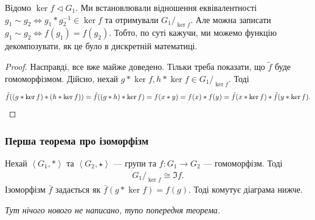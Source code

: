 \documentclass{math_library}
\begin{document}
\begin{remark}
Відомо $\ker f \triangleleft G_1$. Ми встановлювали відношення еквівалентності $g_1 \sim g_2 \iff g_1*g_2^{-1} \in \ker f$ та отримували $G_1/_{\ker f}$. Але можна записати $g_1 \sim g_2 \iff f(g_1) = f(g_2)$. Тобто, по суті кажучи, ми можемо функцію декомпозувати, як це було в дискретній математиці.
\end{remark}

\begin{proof}
Насправді, все вже майже доведено. Тільки треба показати, що $\tilde{f}$ буде гомоморфізмом. Дійсно, нехай $g*\ker f, h*\ker f \in G_1/_{\ker f}$. Тоді
\begin{gather*}
\tilde{f}((g*\ker f)*(h*\ker f)) = \tilde{f}((g*h)*\ker f) = f(x*y) = f(x)*f(y) = \tilde{f}(x*\ker f)* \tilde{f}(y*\ker f). \qedhere
\end{gather*}
\end{proof}

\subsubsection{Перша теорема про ізоморфізм}
\begin{theorem}
Нехай $\left<G_1, * \right>$ та $\left<G_2, \star \right>$ --- групи та $f \colon G_1 \to G_2$ --- гомоморфізм. Тоді 
\begin{align*}
{G_1}/_{\ker f} \cong \Im f. 
\end{align*}
Ізоморфізм $\bar{f}$ задається як $\bar{f}(g*\ker f) = f(g)$. Тоді комутує діаграма нижче.
\begin{figure}[H]
\centering
{}
\end{figure}
\textit{Тут нічого нового не написано, тупо попередня теорема.}
\end{theorem}
\end{document}
